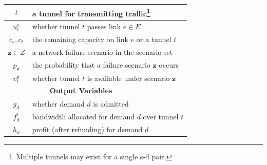 \documentclass[sigconf]{acmart}
\begin{document}
\begin{table}[h!]
\begin{tabular}{ccccccc}
\hline
$t$ &\multicolumn{6}{|l}{a tunnel for transmitting traffic\footnote{Multiple tunnels may exist for a single s-d pair.}}\\
\hline
$u_t^e$ &\multicolumn{6}{|l}{whether tunnel $t$ passes link $e \in E$}\\
\hline
$c_e, c_t$ &\multicolumn{6}{|l}{the remaining capacity on link $e$ or a tunnel $t$}\\
\hline
$\mathbf{z}\in Z$ &\multicolumn{6}{|l}{a network failure scenario in the scenario set}\\
\hline
$p_{\mathbf{z}}$ &\multicolumn{6}{|l}{the probability that a failure scenario $\mathbf{z}$ occurs}\\
\hline
$v_t^{\mathbf{z}}$ &\multicolumn{6}{|l}{whether tunnel $t$ is available under scenario $\mathbf{z}$}\\
 \hline
\hline

&\textbf{Output Variables}\\
\hline
$g_d$& \multicolumn{6}{|l}{whether demand $d$ is admitted}\\
\hline
$f_d^t$& \multicolumn{6}{|l}{bandwidth allocated for demand $d$ over tunnel $t$}\\
\hline
$h_d$& \multicolumn{6}{|l}{profit (after refunding)  for demand $d$}\\
\bottomrule
\bottomrule
\end{tabular}
\end{table}
\end{document}

